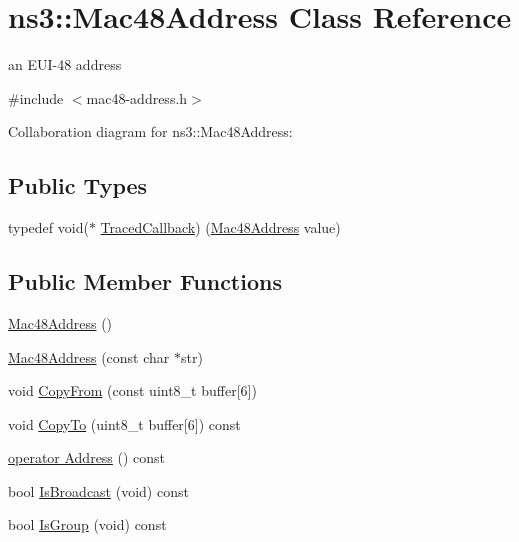 \hypertarget{classns3_1_1Mac48Address}{}\section{ns3\+:\+:Mac48\+Address Class Reference}
\label{classns3_1_1Mac48Address}


an E\+U\+I-\/48 address  




{\ttfamily \#include $<$mac48-\/address.\+h$>$}



Collaboration diagram for ns3\+:\+:Mac48\+Address\+:
\subsection*{Public Types}
\begin{DoxyCompactItemize}
\item 
typedef void($\ast$ \hyperlink{classns3_1_1Mac48Address_adcb5e36f687ed5dfcae0bdccc0a65881}{Traced\+Callback}) (\hyperlink{classns3_1_1Mac48Address}{Mac48\+Address} value)
\end{DoxyCompactItemize}
\subsection*{Public Member Functions}
\begin{DoxyCompactItemize}
\item 
\hyperlink{classns3_1_1Mac48Address_a17882c09fc6317d5bcf4efdb62a37d07}{Mac48\+Address} ()
\item 
\hyperlink{classns3_1_1Mac48Address_a8243481c4102fd82a8c47d12d0bfd1a3}{Mac48\+Address} (const char $\ast$str)
\item 
void \hyperlink{classns3_1_1Mac48Address_a62033fab3f2c573f0cc0be1121d493d2}{Copy\+From} (const uint8\+\_\+t buffer\mbox{[}6\mbox{]})
\item 
void \hyperlink{classns3_1_1Mac48Address_af18ec8c52c35fccc664802747ae9a0b6}{Copy\+To} (uint8\+\_\+t buffer\mbox{[}6\mbox{]}) const 
\item 
\hyperlink{classns3_1_1Mac48Address_a14763cf98117251efa31301673a84aa4}{operator Address} () const 
\item 
bool \hyperlink{classns3_1_1Mac48Address_ad9909ad21bac501799fb8810bfc58c1e}{Is\+Broadcast} (void) const 
\item 
bool \hyperlink{classns3_1_1Mac48Address_ae191b13b8ecd9d138c2301483ab826e8}{Is\+Group} (void) const 
\end{DoxyCompactItemize}
